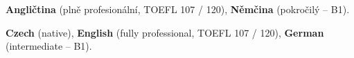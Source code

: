 \ifczech

\textbf{Angličtina} (plně profesionální, TOEFL 107 / 120), \textbf{Němčina} (pokročilý -- B1).

\else

\textbf{Czech} (native), \textbf{English} (fully professional, TOEFL 107 / 120), \textbf{German} (intermediate -- B1).

\fi